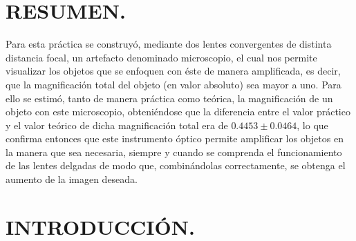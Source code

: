\documentclass[10pt,a4paper]{article}
\begin{document}
\portada

\section{RESUMEN.} %
Para esta práctica se construyó, mediante dos lentes convergentes de distinta distancia focal, un artefacto denominado microscopio, el cual nos permite visualizar los objetos que se enfoquen con éste de manera amplificada, es decir, que la magnificación total del objeto (en valor absoluto) sea mayor a uno. Para ello se estimó, tanto de manera práctica como teórica, la magnificación de un objeto con este microscopio, obteniéndose que la diferencia entre el valor práctico y el valor teórico de dicha magnificación total era de $0.4453\pm 0.0464$, lo que confirma entonces que este instrumento óptico permite amplificar los objetos en la manera que sea necesaria, siempre y cuando se comprenda el funcionamiento de las lentes delgadas de modo que, combinándolas correctamente, se obtenga el aumento de la imagen deseada.

\section{INTRODUCCIÓN.} %
\end{document}
